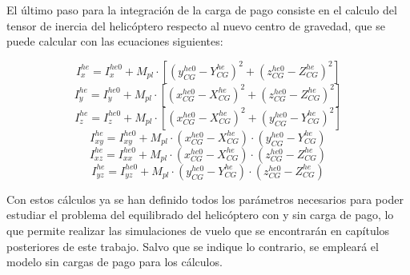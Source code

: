 El último paso para la integración de la carga de pago consiste en el calculo del tensor de inercia del helicóptero respecto al nuevo centro de gravedad, que se puede calcular con las ecuaciones siguientes:

\begin{equation}
I_x^{he}=I_x^{he0}+M_{pl}\cdot[(y_{CG}^{he0}-Y_{CG}^{he})^2+(z_{CG}^{he0}-Z_{CG}^{he})^2]
\end{equation}
\begin{equation}
I_y^{he}=I_y^{he0}+M_{pl}\cdot[(x_{CG}^{he0}-X_{CG}^{he})^2+(z_{CG}^{he0}-Z_{CG}^{he})^2]
\end{equation}
\begin{equation}
I_z^{he}=I_z^{he0}+M_{pl}\cdot[(x_{CG}^{he0}-X_{CG}^{he})^2+(y_{CG}^{he0}-Y_{CG}^{he})^2]
\end{equation}
\begin{equation}
I_{xy}^{he}=I_{xy}^{he0}+M_{pl}\cdot(x_{CG}^{he0}-X_{CG}^{he})\cdot(y_{CG}^{he0}-Y_{CG}^{he})
\end{equation}
\begin{equation}
I_{xz}^{he}=I_{xx}^{he0}+M_{pl}\cdot(x_{CG}^{he0}-X_{CG}^{he})\cdot(z_{CG}^{he0}-Z_{CG}^{he})
\end{equation}
\begin{equation}
I_{yz}^{he}=I_{yz}^{he0}+M_{pl}\cdot(y_{CG}^{he0}-Y_{CG}^{he})\cdot(z_{CG}^{he0}-Z_{CG}^{he})
\end{equation}

Con estos cálculos ya se han definido todos los parámetros necesarios para poder estudiar el problema del equilibrado del helicóptero con y sin carga de pago, lo que permite realizar las simulaciones de vuelo que se encontrarán en capítulos posteriores de este trabajo. Salvo que se indique lo contrario, se empleará el modelo sin cargas de pago para los cálculos.
